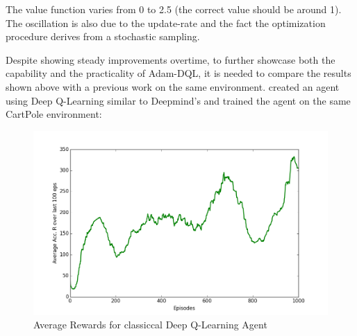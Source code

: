         The value function varies from 0 to 2.5 (the correct value should be around 1). The oscillation is also due to the update-rate and the fact the optimization procedure derives from a stochastic sampling.
        \fi
        \par
         Despite showing steady improvements overtime, to further showcase both the capability and the practicality of Adam-DQL, it is needed to compare the results shown above with a previous work on the same environment. \cite{flappyDL} created an agent using Deep Q-Learning similar to Deepmind's \cite{mnih2015humanlevel} and trained the agent on the same CartPole environment:
         \begin{figure}[H]
             \centering
             \includegraphics[scale=0.4]{images/rewardcartpole.png}
             \caption[Average Rewards for classiccal Deep Q-Learning Agent]{Average Rewards for classiccal Deep Q-Learning Agent \cite{lillicrap2015continuous}}
             \label{fig:cartpole4}
         \end{figure}
        
